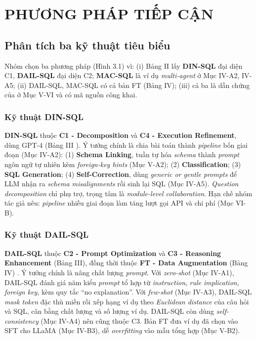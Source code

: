 \chapter{PHƯƠNG PHÁP TIẾP CẬN}

\section{Phân tích ba kỹ thuật tiêu biểu}

Nhóm chọn ba phương pháp (Hình 3.1) vì: (i) Bảng II \cite{ref1} lấy \textbf{DIN-SQL} \cite{ref4} đại diện C1, \textbf{DAIL-SQL} \cite{ref5} đại diện C2; \textbf{MAC-SQL} \cite{ref6} là ví dụ \emph{multi-agent} ở Mục IV-A2, IV-A5; (ii) DAIL-SQL, MAC-SQL có cả bản FT (Bảng IV); (iii) cả ba là dẫn chứng của \cite{ref1} ở Mục V-VI và có mã nguồn công khai.

\subsection{Kỹ thuật DIN-SQL}

\textbf{DIN-SQL} \cite{ref4} thuộc \textbf{C1 - Decomposition} và \textbf{C4 - Execution Refinement}, dùng GPT-4\textasteriskcentered{} (Bảng III \cite{ref1}). Ý tưởng chính là chia bài toán thành \emph{pipeline} bốn giai đoạn (Mục IV-A2): (1) \textbf{Schema Linking}, tuần tự hóa \emph{schema} thành \emph{prompt} ngôn ngữ tự nhiên kèm \emph{foreign-key hints} (Mục V-A2); (2) \textbf{Classification}; (3) \textbf{SQL Generation}; (4) \textbf{Self-Correction}, dùng \emph{generic or gentle prompts} để LLM nhận ra \emph{schema misalignments} rồi sinh lại SQL (Mục IV-A5). \emph{Question decomposition} chỉ phụ trợ, trọng tâm là \emph{module-level collaboration}. Hạn chế nhóm tác giả nêu: \emph{pipeline} nhiều giai đoạn làm tăng lượt gọi API và chi phí (Mục VI-B).

\subsection{Kỹ thuật DAIL-SQL}

\textbf{DAIL-SQL} \cite{ref5} thuộc \textbf{C2 - Prompt Optimization} và \textbf{C3 - Reasoning Enhancement} (Bảng III), đồng thời thuộc \textbf{FT - Data Augmentation} (Bảng IV) \cite{ref1}. Ý tưởng chính là nâng chất lượng \emph{prompt}. Với \emph{zero-shot} (Mục IV-A1), DAIL-SQL đánh giá năm kiểu \emph{prompt} tổ hợp từ \emph{instruction}, \emph{rule implication}, \emph{foreign key}, kèm quy tắc “no explanation”. Với \emph{few-shot} (Mục IV-A3), DAIL-SQL \emph{mask} \emph{token} đặc thù miền rồi xếp hạng ví dụ theo \emph{Euclidean distance} của câu hỏi và SQL, cân bằng chất lượng và số lượng ví dụ. DAIL-SQL còn dùng \emph{self-consistency} (Mục IV-A4) nên cũng thuộc C3. Bản FT đưa ví dụ đã chọn vào SFT cho LLaMA\textasteriskcentered{} (Mục IV-B3), dễ \emph{overfitting} vào mẫu tổng hợp (Mục V-B2).

